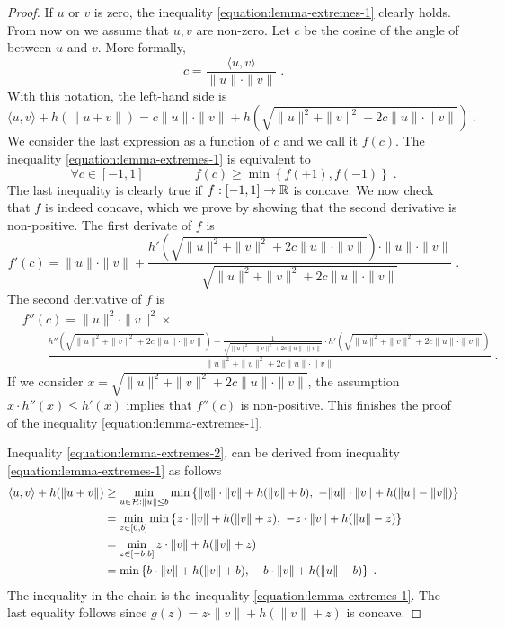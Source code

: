 \begin{proof}
If $u$ or $v$ is zero, the inequality \eqref{equation:lemma-extremes-1} clearly holds. From now on we assume that
$u,v$ are non-zero. Let $c$ be the cosine of the angle of between $u$ and $v$.
More formally,
$$
c = \frac{\langle u, v \rangle}{\|u\| \cdot \|v\|} \; .
$$
With this notation, the left-hand side is
$$
\langle u, v \rangle + h(\|u + v\|) = c \|u\| \cdot \|v\|  + h(\sqrt{\|u\|^2 + \|v\|^2 + 2 c \|u\| \cdot \|v\|}) \; .
$$
We consider the last expression as a function of $c$ and we call it $f(c)$. The
inequality \eqref{equation:lemma-extremes-1} is equivalent to
$$
\forall c \in [-1,1] \qquad \qquad f(c) \ge \min \left\{f(+1), f(-1)\right\} \; .
$$
The last inequality is clearly true if $f:[-1,1] \to \mathbb{R}$ is concave. We now
check that $f$ is indeed concave, which we prove by showing that the second
derivative is non-positive. The first derivate of $f$ is
$$
f'(c) = \|u\| \cdot \|v\| + \frac{h'(\sqrt{\|u\|^2 + \|v\|^2 + 2 c \|u\| \cdot \|v\|}) \cdot \|u\| \cdot \|v\|}{\sqrt{\|u\|^2 + \|v\|^2 + 2 c \|u\| \cdot \|v\|}} \; .
$$
The second derivative of $f$ is
\begin{align*}
&f''(c) = \|u\|^2 \cdot \|v\|^2 \times \\
&\qquad \frac{h''(\sqrt{\|u\|^2 + \|v\|^2 + 2 c \|u\| \cdot \|v\|})  - \frac{1}{\sqrt{\|u\|^2 + \|v\|^2 + 2c \|u\| \cdot \|v\|}} \cdot h'(\sqrt{\|u\|^2 + \|v\|^2 + 2 c \|u\| \cdot \|v\|})  }{\|u\|^2 + \|v\|^2 + 2 c \|u\| \cdot \|v\|} \; .
\end{align*}
If we consider $x=\sqrt{\|u\|^2 + \|v\|^2 + 2 c \|u\| \cdot \|v\|}$, the
assumption $x \cdot h''(x) \le h'(x)$ implies that $f''(c)$ is non-positive.
This finishes the proof of the inequality \eqref{equation:lemma-extremes-1}.

Inequality \eqref{equation:lemma-extremes-2}, can be derived from inequality
\eqref{equation:lemma-extremes-1} as follows
\begin{align*}
\langle u, v \rangle + h(\|u + v\|)
& \ge \min_{u \in \H : \|u\| \le b} \min \left\{ \|u\| \cdot \|v\| + h(\|v\| + b), \ - \|u\| \cdot \|v\| + h(\|u\| - \|v\|) \right\} \\
& = \min_{z \in [0,b]} \min \left\{ z \cdot \|v\| + h(\|v\| + z), \ - z \cdot \|v\| + h(\|u\| - z) \right\} \\
& = \min_{z \in [-b,b]} z \cdot \|v\| + h(\|v\| + z) \\
& = \min \left\{ b \cdot \|v\| + h(\|v\| + b), \ - b \cdot \|v\| + h(\|u\| - b) \right\} \; .
\end{align*}
The inequality in the chain is the inequality \eqref{equation:lemma-extremes-1}.
The last equality follows since $g(z) = z \cdot \|v\| + h(\|v\| + z)$
is concave.
\end{proof}

